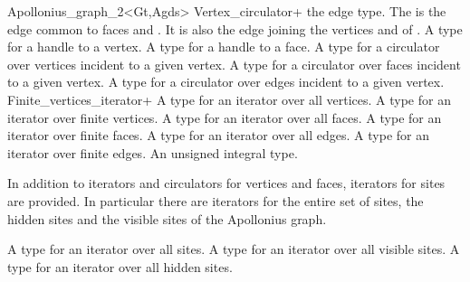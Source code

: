\begin{ccRefClass}{Apollonius_graph_2<Gt,Agds>}
{Vertex_circulator+}{}
%
 {the edge type.
The  is the edge common to faces  and 
. It is also the edge joining the vertices
 and  of .
}
\ccGlue
{}
{A type for a handle to a vertex.}
\ccGlue
{}
{A type for a handle to a face.}
\ccGlue
{}
{A type for a circulator over vertices incident to a given vertex.}
\ccGlue
{}
{A type for a circulator over faces incident to a given vertex.}
\ccGlue
{}
{A type for a circulator over edges incident to a given vertex.}
{Finite_vertices_iterator+}{}
\ccGlue
{}
{A type for an iterator over all vertices.}
\ccGlue
{}
{A type for an iterator over finite vertices.}
\ccGlue
{}
{A type for an iterator over all faces.}
\ccGlue
{}
{A type for an iterator over finite faces.}
\ccGlue
{}
{A type for an iterator over all edges.}
\ccGlue
{}
{A type for an iterator over finite edges.}
\ccGlue
{}
{An unsigned integral type.}


In addition to iterators and circulators for vertices and faces,
iterators for sites are provided. In particular there are iterators
for the entire set of sites, the hidden sites and the visible sites of
the Apollonius graph.

{}

\ccGlue
{}
{A type for an iterator over all sites.}
\ccGlue
{}
{A type for an iterator over all visible sites.}
\ccGlue
{}
{A type for an iterator over all hidden sites.}


\end{ccRefClass}
